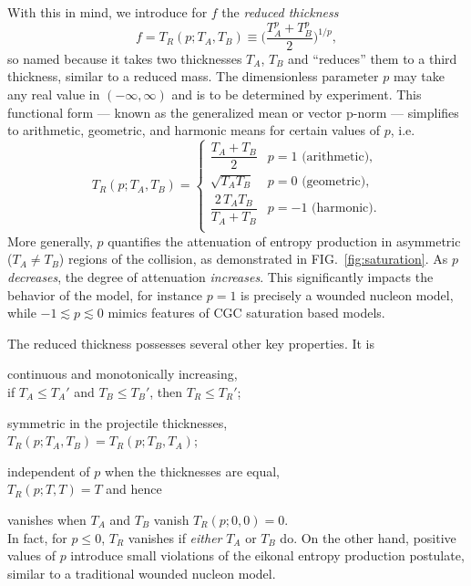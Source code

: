 \documentclass[aps,prl,reprint,amsmath,nofootinbib]{revtex4-1}
\begin{document}
With this in mind, we introduce for $f$ the \emph{reduced thickness}
\begin{equation}
  f = T_R(p; T_A, T_B) \equiv \biggl( \frac{T_A^p + T_B^p}{2} \biggr)^{1/p},
  \label{eq:tr}
\end{equation}
so named because it takes two thicknesses $T_A$, $T_B$ and ``reduces'' them to a third thickness, similar to a
reduced mass.  The dimensionless parameter $p$ may take any real value in $(-\infty, \infty)$ and is to be
determined by experiment.  This functional form --- known as the generalized mean or vector p-norm --- simplifies to arithmetic,
geometric, and harmonic means for certain values of $p$, i.e.
\begin{equation}
  T_R(p; T_A, T_B) =
  \begin{cases}
    \dfrac{T_A + T_B}{2} & p = 1 \text{ (arithmetic)}, \\[2ex]
    \sqrt{T_A T_B} & p = 0 \text{ (geometric)}, \\[2ex]
    \dfrac{2\, T_A T_B}{T_A + T_B} & p = -1 \text{ (harmonic)}. \\
  \end{cases}
\end{equation}
More generally, $p$ quantifies the attenuation of entropy production in asymmetric ($T_A \neq T_B$) regions of
the collision, as demonstrated in FIG.~\ref{fig:saturation}.  As $p$ \emph{decreases}, the degree of
attenuation \emph{increases}.  This significantly impacts the behavior of the model, for instance $p=1$ is
precisely a wounded nucleon model, while $-1 \lesssim p \lesssim 0$ mimics features of CGC saturation based models.

The reduced thickness possesses several other key properties.  It is
\renewcommand{\labelenumi}{(\alph{enumi})}
\begin{enumerate*}
  \item continuous and monotonically increasing, \\ if $T_A \leq T_A'$ and $T_B \leq T_B'$, then $T_R \leq T_R'$;
  \item symmetric in the projectile thicknesses, \\ $T_R(p; T_A, T_B) = T_R(p; T_B, T_A)$;
  \item independent of $p$ when the thicknesses are equal, \\ $T_R(p; T, T) = T$ and hence
  \item vanishes when $T_A$ and $T_B$ vanish $T_R(p; 0, 0) = 0$. \\ In fact, for $p \leq 0$, $T_R$ vanishes 
     if \emph{either} $T_A$ or $T_B$ do.  On the other hand, positive values of $p$ introduce small violations 
    of the eikonal entropy production postulate, similar to a traditional wounded nucleon model.
\end{enumerate*}
\end{document}
